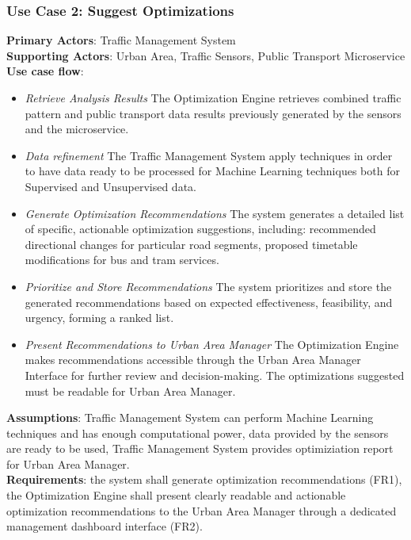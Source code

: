 \documentclass[a4paper,12pt]{article}
\begin{document}
\subsubsection*{Use Case 2: Suggest Optimizations}
\textbf{Primary Actors}: Traffic Management System \\
\textbf{Supporting Actors}:  Urban Area, Traffic Sensors, Public Transport Microservice \\
\textbf{Use case flow}: 
\begin{itemize}
\item \textit{Retrieve Analysis Results}
The Optimization Engine retrieves combined traffic pattern and public transport data results previously generated by the sensors and the microservice.
\item \textit{Data refinement} The Traffic Management System apply techniques in order to have data ready to be processed for Machine Learning techniques both for Supervised and Unsupervised data.
\item \textit{Generate Optimization Recommendations} The system generates a detailed list of specific, actionable optimization suggestions, including: recommended directional changes for particular road segments, proposed timetable modifications for bus and tram services.
\item \textit{Prioritize and Store Recommendations} The system prioritizes and store the generated recommendations based on expected effectiveness, feasibility, and urgency, forming a ranked list.
\item \textit{Present Recommendations to Urban Area Manager} The Optimization Engine makes recommendations accessible through the Urban Area Manager Interface for further review and decision-making. The optimizations suggested must be readable for Urban Area Manager.
\end{itemize}
\textbf{Assumptions}: Traffic Management System can perform Machine Learning techniques and has enough computational power, data provided by the sensors are ready to be used, Traffic Management System provides optimiziation report for Urban Area Manager. \\
\textbf{Requirements}: the system shall generate optimization recommendations (FR1), the Optimization Engine shall present clearly readable and actionable optimization recommendations to the Urban Area Manager through a dedicated management dashboard interface (FR2).
\end{document}
